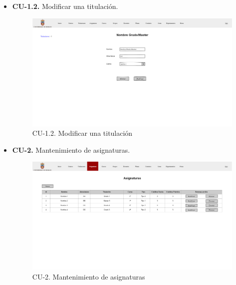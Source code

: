 \begin{itemize}
	\item \textbf{CU-1.2.} Modificar una titulación.
	\begin{figure}[!h]
		\centering
		\includegraphics[width=\textwidth]{../img/Anexos/Vistas/mod_titulacion.png}
		\caption{CU-1.2. Modificar una titulación}\label{fig:../img/Anexos/Vistas/mod_titulacion.png}
	\end{figure}
	
	\item \textbf{CU-2.} Mantenimiento de asignaturas.
	\begin{figure}[!h]
		\centering
		\includegraphics[width=\textwidth]{../img/Anexos/Vistas/asignaturas.png}
		\caption{CU-2. Mantenimiento de asignaturas}\label{fig:../img/Anexos/Vistas/asignaturas.png}
	\end{figure}
	

\end{itemize}
